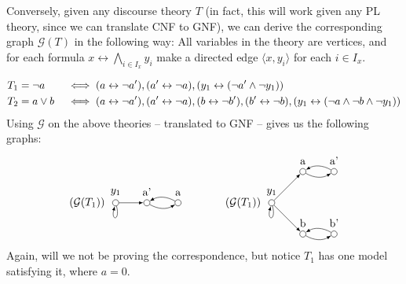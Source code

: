Conversely, given any discourse theory $T$ (in fact, this will work given any PL theory, since we can translate CNF to GNF), we can derive the corresponding graph $\mathcal{G}(T)$ in the following way:
All variables in the theory are vertices, and for each formula $x \leftrightarrow \bigwedge_{i \in I_x} y_i$ make a directed edge $\langle x,y_i \rangle$ for each $i \in I_x$.\\

\begin{example}
  \begin{align}
    T_1 &= \neg a &&\iff ( a \leftrightarrow \neg a'), (a' \leftrightarrow \neg a), (y_1 \leftrightarrow (\neg a' \wedge \neg y_1))\\
    T_2 &= a \vee b &&\iff ( a \leftrightarrow \neg a'), (a' \leftrightarrow \neg a), (b \leftrightarrow \neg b'), (b' \leftrightarrow \neg b), (y_1 \leftrightarrow (\neg a \wedge \neg b \wedge \neg y_1))
  \end{align}
  Using $\mathcal{G}$ on the above theories -- translated to GNF -- gives us the following graphs:
  \[
    \begin{tikzpicture}
      [
      point/.style={circle,draw,inner sep=0pt,minimum size=2mm},
      collection/.style={thick,rectangle,draw,inner sep=0pt,minimum height=14mm, minimum width= 9mm}
      ]
      \node (label) at (0,1) [label=left:$(\mathcal{G}(T_1))\;$] {};
      \node (0) at (0,1) [point,label=above:$y_1$] {};
      \node (1) at (1,1) [point,label=above:a'] {};
      \node (2) at (2,1) [point,label=above:a] {};
      \draw [-latex, loop below] (0) to (0);
      \draw [-latex] (0) to (1);
      \draw [-latex, bend right] (1) to (2);
      \draw [-latex, bend right] (2) to (1);

      \node (label) at (5,1) [label=left:$(\mathcal{G}(T_1))\;$] {};
      \node (0) at (5,1) [point,label=above:$y_1$] {};
      \node (1) at (6,0) [point,label=above:b] {};
      \node (2) at (7,0) [point,label=above:b'] {};
      \node (3) at (6,2) [point,label=above:a] {};
      \node (4) at (7,2) [point,label=above:a'] {};
      \draw [-latex, loop below] (0) to (0);
      \draw [-latex] (0) to (1);
      \draw [-latex, bend right] (1) to (2);
      \draw [-latex, bend right] (2) to (1);
      \draw [-latex] (0) to (3);
      \draw [-latex, bend right] (3) to (4);
      \draw [-latex, bend right] (4) to (3);
    \end{tikzpicture}
  \]
  Again, will we not be proving the correspondence, but notice $T_1$ has one model satisfying it, where $a = 0$.
\end{example}

